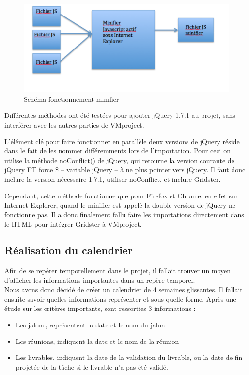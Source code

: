 \documentclass[12pt]{report}
\begin{document}
	\begin{figure}[H]
	\centering
	\includegraphics[width=1\textwidth]{pictures/matthieu/m_minifier.png}
	\caption{Schéma fonctionnement minifier}
	\label{w2}
\end{figure}
	
Différentes méthodes ont été testées pour ajouter jQuery 1.7.1 au projet, sans interférer avec les autres parties de VMproject.

L’élément clé pour faire fonctionner en parallèle deux versions de jQuery réside dans le fait de les nommer différemments lors de l’importation. Pour ceci on utilise la méthode noConflict() de jQuery, qui retourne la version courante de jQuery ET force \$ -- variable jQuery -- à ne plus pointer vers jQuery. Il faut donc inclure la version nécessaire 1.7.1, utiliser noConflict, et inclure Gridster.

Cependant, cette méthode fonctionne que pour Firefox et Chrome, en effet sur Internet Explorer, quand le minifier est appelé la double version de jQuery ne fonctionne pas. Il a donc finalement fallu faire les importations directement dans le HTML pour intégrer Gridster à VMproject.

	\subsection{Réalisation du calendrier}
	
Afin de se repérer temporellement dans le projet, il fallait trouver un moyen d’afficher les informations importantes dans un repère temporel.\\

Nous avons donc décidé de créer un calendrier de 4 semaines glissantes. Il fallait ensuite savoir quelles informations représenter et sous quelle forme. Après une étude sur les critères importants, sont ressorties 3 informations :\\
	
	\begin{itemize}
\item	Les jalons, représentent la date et le nom du jalon
\item	Les réunions, indiquent la date et le nom de la réunion
\item	Les livrables, indiquent la date de la validation du livrable, ou la date de fin projetée de la tâche si le livrable n’a pas été validé.\\
	\end{itemize}
\end{document}
